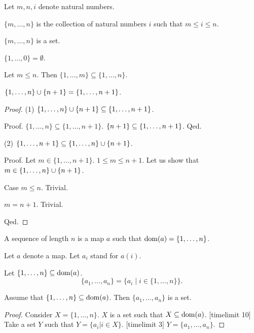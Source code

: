 \documentclass[english,11pt]{article}
\newcommand{\Seq}[2]{\{#1,\dots,#2\}}
\newcommand{\FinSet}[3]{\{#1_{#2},\dots,#1_{#3}\}}
\begin{document}
\begin{forthel}

Let $m,n,i$ denote natural numbers.

\begin{definition}
$\Seq{m}{n}$ is the collection of
natural numbers $i$ such that $m \leq i \leq n$.
\end{definition}

\begin{lemma}
$\Seq{m}{n}$ is a set.
\end{lemma}

\begin{lemma}
$\Seq{1}{0} = \emptyset$.
\end{lemma}

\begin{lemma}
Let $m \leq n$. Then $\Seq{1}{m} \subseteq \Seq{1}{n}$.
\end{lemma}

\begin{lemma}
$\Seq{1}{n} \cup \sing{n+1} = \Seq{1}{n+1}$.
\end{lemma}
\begin{proof}

(1) $\Seq{1}{n} \cup \sing{n+1} \subseteq \Seq{1}{n+1}$.

Proof. $\Seq{1}{n} \subseteq \Seq{1}{n+1}$.
$\sing{n+1} \subseteq \Seq{1}{n+1}$.
Qed.

(2) $\Seq{1}{n+1} \subseteq \Seq{1}{n} \cup \sing{n+1}$.

Proof.
Let $m \in \Seq{1}{n+1}$. $1 \leq m \leq n+1$. Let us show that 
$m \in \Seq{1}{n} \cup \sing{n+1}$.

Case $m \leq n$. Trivial.

$m = n+1$. Trivial.

Qed.

\end{proof}

\begin{definition}
A sequence of length $n$ is a
map $a$ such that $\dom(a) = \Seq{1}{n}$.
\end{definition}

Let $a$ denote a map.
Let $a_{i}$ stand for $a(i)$.

\begin{definition}
Let $\Seq{1}{n} \subseteq \dom(a)$.
\[\FinSet{a}{1}{n} = \{ a_{i} \mid i \in \Seq{1}{n}\}.\]
\end{definition}


\begin{lemma}
Assume that $\Seq{1}{n} \subseteq \dom(a)$.
Then $\FinSet{a}{1}{n}$ is a set.
\end{lemma}
\begin{proof}
Consider $X = \Seq{1}{n}$. $X$ is a set such that $X \subseteq \operatorname{dom}(a)$.
[timelimit 10]
Take a set $Y$ such that $Y = \{ a_{i} | i \in X\}$.
[timelimit 3]
$Y = \FinSet{a}{1}{n}$.
\end{proof}



\end{forthel}
\end{document}
